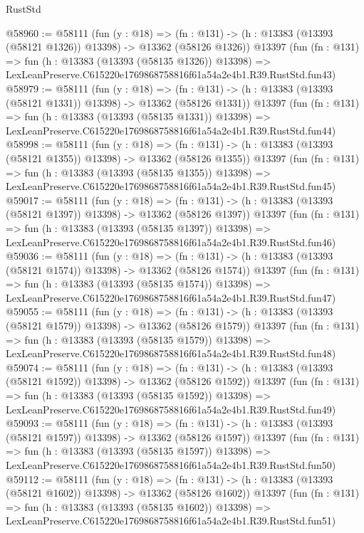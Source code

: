 \begin{lexlean}{RustStd}
\begin{coremodule}
@58960 := @58111
    (fun (y : @18) =>
    (fn : @131) -> (h : @13383 (@13393 (@58121 @1326)) @13398) -> @13362 (@58126 @1326))
    @13397
    (fun (fn : @131) =>
    fun (h : @13383 (@13393 (@58135 @1326)) @13398) =>
    LexLeanPreserve.C615220e1769868758816f61a54a2e4b1.R39.RustStd.fun43)
@58979 := @58111
    (fun (y : @18) =>
    (fn : @131) -> (h : @13383 (@13393 (@58121 @1331)) @13398) -> @13362 (@58126 @1331))
    @13397
    (fun (fn : @131) =>
    fun (h : @13383 (@13393 (@58135 @1331)) @13398) =>
    LexLeanPreserve.C615220e1769868758816f61a54a2e4b1.R39.RustStd.fun44)
@58998 := @58111
    (fun (y : @18) =>
    (fn : @131) -> (h : @13383 (@13393 (@58121 @1355)) @13398) -> @13362 (@58126 @1355))
    @13397
    (fun (fn : @131) =>
    fun (h : @13383 (@13393 (@58135 @1355)) @13398) =>
    LexLeanPreserve.C615220e1769868758816f61a54a2e4b1.R39.RustStd.fun45)
@59017 := @58111
    (fun (y : @18) =>
    (fn : @131) -> (h : @13383 (@13393 (@58121 @1397)) @13398) -> @13362 (@58126 @1397))
    @13397
    (fun (fn : @131) =>
    fun (h : @13383 (@13393 (@58135 @1397)) @13398) =>
    LexLeanPreserve.C615220e1769868758816f61a54a2e4b1.R39.RustStd.fun46)
@59036 := @58111
    (fun (y : @18) =>
    (fn : @131) -> (h : @13383 (@13393 (@58121 @1574)) @13398) -> @13362 (@58126 @1574))
    @13397
    (fun (fn : @131) =>
    fun (h : @13383 (@13393 (@58135 @1574)) @13398) =>
    LexLeanPreserve.C615220e1769868758816f61a54a2e4b1.R39.RustStd.fun47)
@59055 := @58111
    (fun (y : @18) =>
    (fn : @131) -> (h : @13383 (@13393 (@58121 @1579)) @13398) -> @13362 (@58126 @1579))
    @13397
    (fun (fn : @131) =>
    fun (h : @13383 (@13393 (@58135 @1579)) @13398) =>
    LexLeanPreserve.C615220e1769868758816f61a54a2e4b1.R39.RustStd.fun48)
@59074 := @58111
    (fun (y : @18) =>
    (fn : @131) -> (h : @13383 (@13393 (@58121 @1592)) @13398) -> @13362 (@58126 @1592))
    @13397
    (fun (fn : @131) =>
    fun (h : @13383 (@13393 (@58135 @1592)) @13398) =>
    LexLeanPreserve.C615220e1769868758816f61a54a2e4b1.R39.RustStd.fun49)
@59093 := @58111
    (fun (y : @18) =>
    (fn : @131) -> (h : @13383 (@13393 (@58121 @1597)) @13398) -> @13362 (@58126 @1597))
    @13397
    (fun (fn : @131) =>
    fun (h : @13383 (@13393 (@58135 @1597)) @13398) =>
    LexLeanPreserve.C615220e1769868758816f61a54a2e4b1.R39.RustStd.fun50)
@59112 := @58111
    (fun (y : @18) =>
    (fn : @131) -> (h : @13383 (@13393 (@58121 @1602)) @13398) -> @13362 (@58126 @1602))
    @13397
    (fun (fn : @131) =>
    fun (h : @13383 (@13393 (@58135 @1602)) @13398) =>
    LexLeanPreserve.C615220e1769868758816f61a54a2e4b1.R39.RustStd.fun51)

\end{coremodule}
\end{lexlean}

